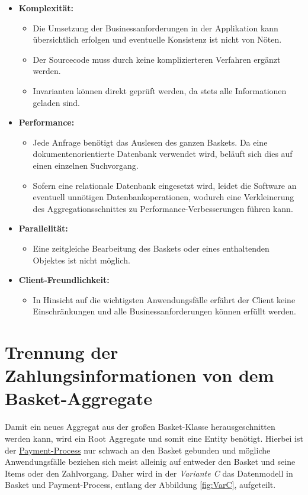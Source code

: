 \begin{itemize}[noitemsep,nolistsep,topsep=-2pt]
	\item \textbf{Komplexität: } {
		\begin{itemize}
			\item {Die Umsetzung der Businessanforderungen in der Applikation kann übersichtlich erfolgen und eventuelle Konsistenz ist nicht von Nöten. }
			\item {Der Sourcecode muss durch keine komplizierteren Verfahren ergänzt werden.}
			\item {Invarianten können direkt geprüft werden, da stets alle Informationen geladen sind. }
		\end{itemize}
	}
	\item \textbf{Performance: } {
		\begin{itemize}
			\item Jede Anfrage benötigt das Auslesen des ganzen Baskets. Da eine dokumentenorientierte Datenbank verwendet wird, beläuft sich dies auf einen einzelnen Suchvorgang.
			\item Sofern eine relationale Datenbank eingesetzt wird, leidet die Software an eventuell unnötigen Datenbankoperationen, wodurch eine Verkleinerung des Aggregationsschnittes zu Performance-Verbesserungen führen kann.
		\end{itemize}
	}
	\item \textbf{Parallelität: } {
		\begin{itemize}
			\item Eine zeitgleiche Bearbeitung des Baskets oder eines enthaltenden Objektes ist nicht möglich.
		\end{itemize}	
	}
	\item \textbf{Client-Freundlichkeit: } {
		\begin{itemize}
			\item In Hinsicht auf die wichtigsten Anwendungsfälle erfährt der Client keine Einschränkungen und alle Businessanforderungen können erfüllt werden.
		\end{itemize}
	}
\end{itemize}


\section{Trennung der Zahlungsinformationen von dem Basket-Aggregate}

Damit ein neues Aggregat aus der großen Basket-Klasse herausgeschnitten werden kann, wird ein Root Aggregate und somit eine Entity benötigt. Hierbei ist der \ul{Payment-Process} nur schwach an den Basket gebunden und mögliche Anwendungsfälle beziehen sich meist alleinig auf entweder den Basket und seine Items oder den Zahlvorgang. Daher wird in der \emph{Variante C} das Datenmodell in Basket und Payment-Process, entlang der Abbildung \ref{fig:VarC}, aufgeteilt. 

